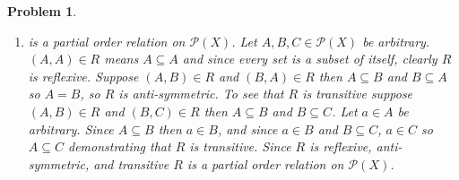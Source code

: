 \documentclass{article}
\newtheorem{Problem}{Problem}
\begin{document}
\begin{Problem}
\begin{enumerate}
    \item is a partial order relation on $\mathcal{P}(X)$.  Let $A,B,C\in\mathcal{P}(X)$ be arbitrary.  $(A,A)\in R$ means $A\subseteq A$ and since every set is a subset of itself, clearly $R$ is reflexive.  Suppose $(A,B)\in R$ and $(B,A)\in R$ then $A\subseteq B$ and $B\subseteq A$ so $A=B$, so $R$ is anti-symmetric.  To see that $R$ is transitive suppose $(A,B)\in R$ and $(B,C)\in R$ then $A\subseteq B$ and $B\subseteq C$.  Let $a\in A$ be arbitrary.  Since $A\subseteq B$ then $a\in B$, and since $a\in B$ and $B\subseteq C$, $a\in C$ so $A\subseteq C$ demonstrating that $R$ is transitive.  Since $R$ is reflexive, anti-symmetric, and transitive $R$ is a partial order relation on $\mathcal{P}(X)$.
\end{enumerate}
\end{Problem}
\end{document}
